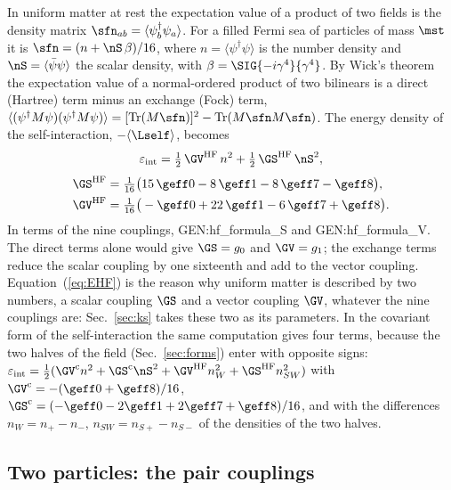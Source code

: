 In uniform matter at rest the expectation value of a product of two fields is the density matrix
$\sfn_{ab}=\langle\psi_b^\dagger\psi_a\rangle$. For a filled Fermi sea of particles of mass $\mst$
it is $\sfn=(n+\nS\,\beta)/16$, where $n=\langle\psi^\dagger\psi\rangle$ is the number density and
$\nS=\langle\bar\psi\psi\rangle$ the scalar density, with $\beta=\SIG{-i\gamma^{4}}{\gamma^{4}}$. By
Wick's theorem the expectation value of a normal-ordered product of two bilinears is a direct
(Hartree) term minus an exchange (Fock) term,
$\langle(\psi^\dagger M\psi)(\psi^\dagger M\psi)\rangle=[\mathrm{Tr}(M\sfn)]^{2}-\mathrm{Tr}(M\sfn M\sfn)$.
The energy density of the self-interaction, $-\langle\Lself\rangle$, becomes
\begin{equation}
\varepsilon_{\mathrm{int}}=\tfrac12\,\GV^{\mathrm{HF}}\,n^{2}+\tfrac12\,\GS^{\mathrm{HF}}\,\nS^{2},
\label{eq:EHF}
\end{equation}
\begin{equation}
\begin{aligned}
\GS^{\mathrm{HF}}&=\tfrac1{16}\big(15\,\geff0-8\,\geff1-8\,\geff7-\geff8\big),\\
\GV^{\mathrm{HF}}&=\tfrac1{16}\big(-\geff0+22\,\geff1-6\,\geff7+\geff8\big).
\end{aligned}
\label{eq:GHF}
\end{equation}
In terms of the nine couplings, {{GEN:hf_formula_S}} and {{GEN:hf_formula_V}}. The direct terms alone
would give $\GS=g_0$ and $\GV=g_1$; the exchange terms reduce the scalar coupling by one sixteenth
and add to the vector coupling. Equation~(\ref{eq:EHF}) is the reason why uniform matter is described
by two numbers, a scalar coupling $\GS$ and a vector coupling $\GV$, whatever the nine couplings
are: Sec.~\ref{sec:ks} takes these two as its parameters.
In the covariant form of the self-interaction the same computation gives four terms, because the
two halves of the field (Sec.~\ref{sec:forms}) enter with opposite signs:
$\varepsilon_{\mathrm{int}}=\tfrac12(\GV^{\mathrm c}n^{2}+\GS^{\mathrm c}\nS^{2}+\GV^{\mathrm{HF}}n_W^{2}+\GS^{\mathrm{HF}}n_{SW}^{2})$
with $\GV^{\mathrm c}=-(\geff0+\geff8)/16$,
$\GS^{\mathrm c}=(-\geff0-2\geff1+2\geff7+\geff8)/16$, and with the differences
$n_W=n_+-n_-$, $n_{SW}=n_{S+}-n_{S-}$ of the densities of the two halves.

\subsection{Two particles: the pair couplings}
\label{sec:pairs}

